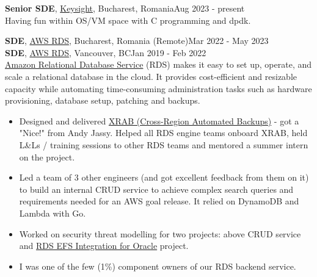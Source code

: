 \documentclass[line, margin]{resume}
\begin{document}
\begin{resume}
\textbf{Senior SDE}, \href{https://www.keysight.com/}{Keysight}, Bucharest, Romania\hfill Aug 2023 - present\\
Having fun within OS/VM space with C programming and dpdk.

\textbf{SDE}, \href{https://aws.amazon.com/}{AWS RDS}, Bucharest, Romania (Remote)\hfill Mar 2022 - May 2023\\
\textbf{SDE}, \href{https://aws.amazon.com/}{AWS RDS}, Vancouver, BC\hfill Jan 2019 - Feb 2022 \\
\href{https://aws.amazon.com/rds/}{Amazon Relational Database Service} (RDS) makes it easy to set up, operate, and scale a relational database in the cloud. It provides cost-efficient and resizable capacity while automating time-consuming administration tasks such as hardware provisioning, database setup, patching and backups.
\begin{itemize} \itemsep -2pt  %
    \item Designed and delivered \href{https://docs.aws.amazon.com/AmazonRDS/latest/UserGuide/USER_ReplicateBackups.html}{XRAB (Cross-Region Automated Backups)} - got a "Nice!" from Andy Jassy. Helped all RDS engine teams onboard XRAB, held L\&Ls / training sessions to other RDS teams and mentored a summer intern on the project.
    \item Led a team of 3 other engineers (and got excellent feedback from them on it) to build an internal CRUD service to achieve complex search queries and requirements needed for an AWS goal release. It relied on DynamoDB and Lambda with Go.
    \item Worked on security threat modelling for two projects: above CRUD service and \href{https://docs.aws.amazon.com/AmazonRDS/latest/UserGuide/oracle-efs-integration.html}{RDS EFS Integration for Oracle} project.
    \item I was one of the few (1\%) component owners of our RDS backend service. %
\end{itemize}



\end{resume}
\end{document}
